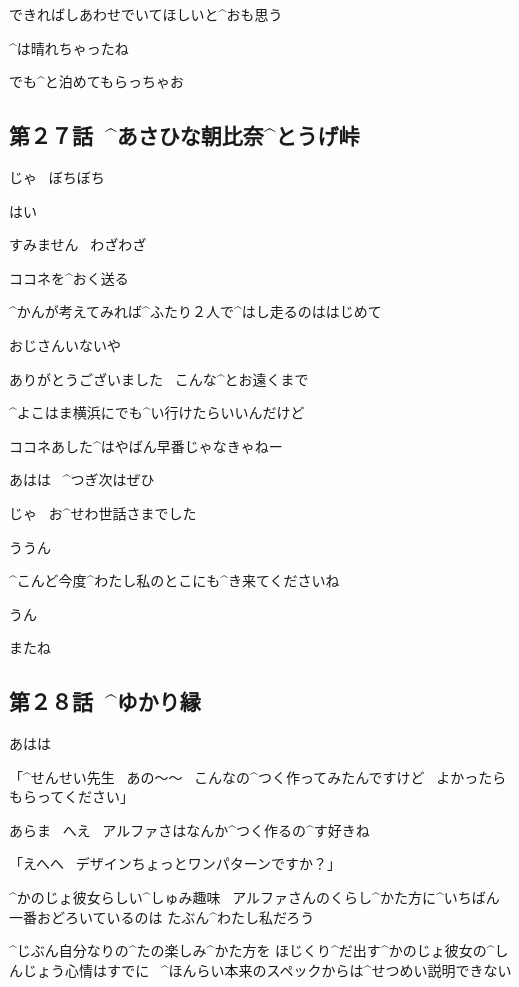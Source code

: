 \ASevenMOne できればしあわせでいてほしいと^{おも}{思}う

\page[52]
\Alpha ^{は}{晴}れちゃったね

\Kokone でも^{と}{泊}めてもらっちゃお


\subsection{第２７話\ ^{あさひな}{朝比奈}^{とうげ}{峠}}

\page[55]
\Alpha じゃ
\ ぼちぼち

\Kokone はい

\Kokone すみません
\ わざわざ

\Alpha ココネを^{おく}{送}る

\Alpha ^{かんが}{考}えてみれば^{ふたり}{２人}で^{はし}{走}るのははじめて

\page[56]
\Alpha おじさんいないや

\page[57]
\Kokone ありがとうございました
\ こんな^{とお}{遠}くまで

\Alpha ^{よこはま}{横浜}にでも^{い}{行}けたらいいんだけど

\Alpha ココネあした^{はやばん}{早番}じゃなきゃねー

\Kokone あはは
\ ^{つぎ}{次}はぜひ

\Kokone じゃ
\ お^{せわ}{世話}さまでした

\Alpha ううん

\page[58]
\Kokone ^{こんど}{今度}^{わたし}{私}のとこにも^{き}{来}てくださいね

\Alpha うん

\page[60]
 またね


\subsection{第２８話\ ^{ゆかり}{縁}}

\page[62]
\Alpha あはは

\Alpha 「^{せんせい}{先生}
\ あの〜〜
\ こんなの^{つく}{作}ってみたんですけど
\ よかったらもらってください」

\Sensei あらま
\ へえ
\ アルファさはなんか^{つく}{作}るの^{す}{好}きね

\Alpha 「えへへ
\ デザインちょっとワンパターンですか？」

\page[63]
\Sensei ^{かのじょ}{彼女}らしい^{しゅみ}{趣味}
\ アルファさんのくらし^{かた}{方}に^{いちばん}{一番}おどろいているのは
たぶん^{わたし}{私}だろう

\Sensei ^{じぶん}{自分}なりの^{たの}{楽}しみ^{かた}{方}を
ほじくり^{だ}{出}す^{かのじょ}{彼女}の^{しんじょう}{心情}はすでに
\ ^{ほんらい}{本来}のスペックからは^{せつめい}{説明}できない

